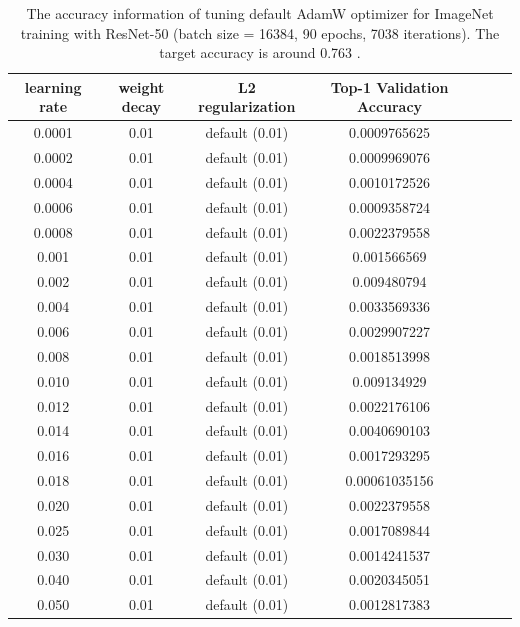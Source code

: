 \begin{table}[ht]
\renewcommand{\arraystretch}{1.3}
\caption{The accuracy information of tuning default AdamW optimizer for ImageNet training with ResNet-50 (batch size = 16384, 90 epochs, 7038 iterations). The target accuracy is around 0.763 \citep{goyal2017accurate}.}
\centering
\begin{tabular}{|c|c|c|c|c|c|c|}
\hline
learning rate & weight decay & L2 regularization & Top-1 Validation Accuracy\\
\hline
\hline
0.0001 & 0.01 & default (0.01) & 0.0009765625 \\
\hline
0.0002 & 0.01 & default (0.01) & 0.0009969076 \\
\hline
0.0004 & 0.01 & default (0.01) & 0.0010172526 \\
\hline
0.0006 & 0.01 & default (0.01) & 0.0009358724 \\
\hline
0.0008 & 0.01 & default (0.01) & 0.0022379558 \\
\hline
0.001 & 0.01 & default (0.01) & 0.001566569 \\
\hline
0.002 & 0.01 & default (0.01) & 0.009480794 \\
\hline
0.004 & 0.01 & default (0.01) & 0.0033569336 \\
\hline
0.006 & 0.01 & default (0.01) & 0.0029907227 \\
\hline
0.008 & 0.01 & default (0.01) & 0.0018513998 \\
\hline
0.010 & 0.01 & default (0.01) & 0.009134929 \\
\hline
0.012 & 0.01 & default (0.01) & 0.0022176106 \\
\hline
0.014 & 0.01 & default (0.01) & 0.0040690103 \\
\hline
0.016 & 0.01 & default (0.01) & 0.0017293295 \\
\hline
0.018 & 0.01 & default (0.01) & 0.00061035156 \\
\hline
0.020 & 0.01 & default (0.01) & 0.0022379558 \\
\hline
0.025 & 0.01 & default (0.01) & 0.0017089844 \\
\hline
0.030 & 0.01 & default (0.01) & 0.0014241537 \\
\hline
0.040 & 0.01 & default (0.01) & 0.0020345051 \\
\hline
0.050 & 0.01 & default (0.01) & 0.0012817383 \\
\hline
\end{tabular}
\label{table:imagenet_adamw_default_l2_4}
\end{table}

